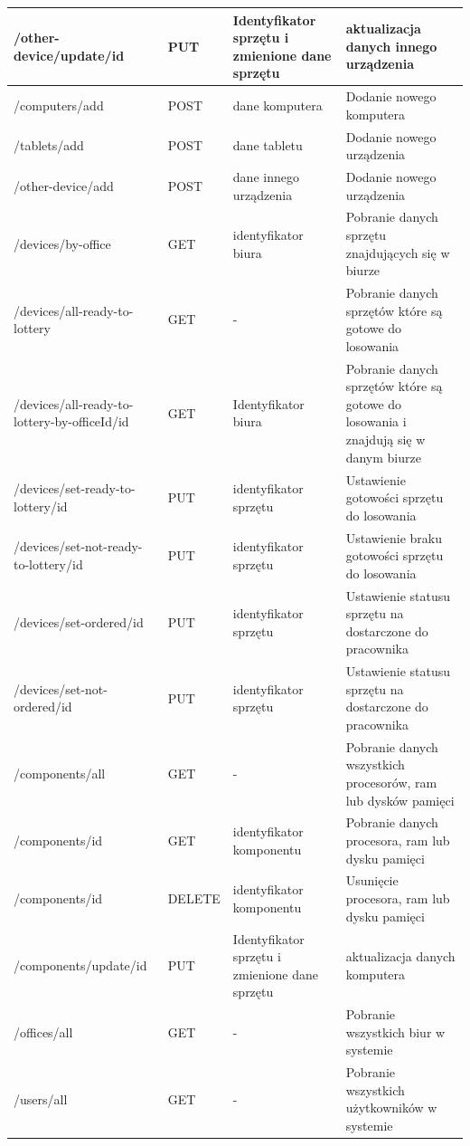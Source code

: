 	\begin{table}[H]
	\centering
	\label{tab:rest}
	\begin{tabularx}{\linewidth}{|X|X|X|X|}
		/other-device/update/id & PUT & Identyfikator sprzętu i zmienione dane sprzętu& aktualizacja danych innego urządzenia\\
		\hline
			 /computers/add & POST	& dane komputera 	& Dodanie nowego komputera	\\
    \hline
		/tablets/add & POST	& dane tabletu & Dodanie nowego urządzenia	\\
    \hline
		/other-device/add & POST	& dane innego urządzenia 	& Dodanie nowego urządzenia	\\
    \hline
		/devices/by-office& GET	& identyfikator biura 	& Pobranie danych sprzętu znajdujących się w biurze\\
    \hline
		/devices/all-ready-to-lottery& GET	& - & Pobranie danych sprzętów które są gotowe do losowania\\
    \hline
		
		/devices/all-ready-to-lottery-by-officeId/id& GET	& Identyfikator biura & Pobranie danych sprzętów które są gotowe do losowania i znajdują się w danym biurze\\
    \hline
		/devices/set-ready-to-lottery/id 		& PUT	& identyfikator sprzętu & Ustawienie gotowości sprzętu do losowania	\\
    \hline
		/devices/set-not-ready-to-lottery/id & PUT	& identyfikator sprzętu & Ustawienie braku gotowości sprzętu do losowania	\\
    \hline
		/devices/set-ordered/id & PUT	& identyfikator sprzętu & Ustawienie statusu sprzętu na dostarczone	do pracownika	\\
    \hline
		/devices/set-not-ordered/id & PUT	& identyfikator sprzętu & Ustawienie statusu sprzętu na dostarczone	do pracownika	\\
    \hline
		/components/all 	& GET & - & Pobranie danych wszystkich procesorów, ram lub dysków pamięci \\
		\hline
		/components/{id} & GET & identyfikator komponentu 	& Pobranie danych procesora, ram lub dysku pamięci\\
    \hline
		/components/{id}	& DELETE & identyfikator komponentu 	& Usunięcie procesora, ram lub dysku pamięci\\
    \hline
		 /components/update/id & PUT & Identyfikator sprzętu i zmienione dane sprzętu& aktualizacja danych komputera\\
		\hline
		 /offices/all	& GET & - & Pobranie wszystkich biur w systemie\\
		\hline
		/users/all	& GET & - & Pobranie wszystkich użytkowników w systemie\\
		\hline
		\end{tabularx}
		\end{table}

